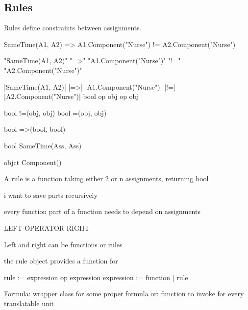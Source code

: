 \subsection{Rules}
Rules define constraints between assignments.


SameTime(A1, A2) => A1.Component("Nurse") != A2.Component("Nurse")

"SameTime(A1, A2)" "=>" "A1.Component("Nurse")" "!=" "A2.Component("Nurse")"

|SameTime(A1, A2)| |=>| |A1.Component("Nurse")| |!=| |A2.Component("Nurse")|
bool			op			obj				 op			obj


bool !=(obj, obj)
bool =(obj, obj)

bool =>(bool, bool)

bool SameTime(Ass, Ass)

objct Component()

A rule is a function taking either 2 or n assignments, returning bool

i want to save parts recursively

every function part of a function needs to depend on assignments

LEFT OPERATOR RIGHT

Left and right can be functions or rules

the rule object provides a function for 


rule		:= expression op expression
expression	:= function | rule

Formula: wrapper class for some proper formula
or: function to invoke for every translatable unit